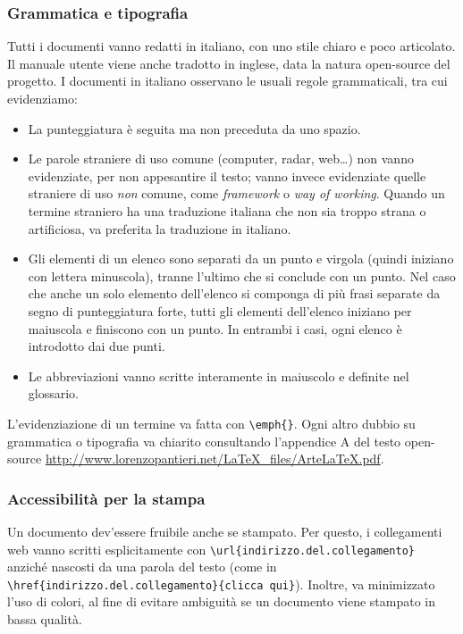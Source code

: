 \subsubsection{Grammatica e tipografia} Tutti i documenti vanno redatti in italiano, con uno stile chiaro e poco articolato. Il manuale utente viene anche tradotto in inglese, data la natura open-source del progetto. I documenti in italiano osservano le usuali regole grammaticali, tra cui evidenziamo:
\begin{itemize}
	\item La punteggiatura è seguita ma non preceduta da uno spazio.
	\item Le parole straniere di uso comune (computer, radar, web\dots) non vanno evidenziate, per non appesantire il testo; vanno invece evidenziate quelle straniere di uso \emph{non} comune, come \emph{framework} o \emph{way of working}. Quando un termine straniero ha una traduzione italiana che non sia troppo strana o artificiosa, va preferita la traduzione in italiano.
	\item Gli elementi di un elenco sono separati da un punto e virgola (quindi iniziano con lettera minuscola), tranne l'ultimo che si conclude con un punto. Nel caso che anche un solo elemento dell'elenco si componga di più frasi separate da segno di punteggiatura forte, tutti gli elementi dell'elenco iniziano per maiuscola e finiscono con un punto. In entrambi i casi, ogni elenco è introdotto dai due punti.
	\item Le abbreviazioni vanno scritte interamente in maiuscolo e definite nel glossario.
\end{itemize}
L'evidenziazione di un termine va fatta con \texttt{\textbackslash emph\{\}}. Ogni altro dubbio su grammatica o tipografia va chiarito consultando l'appendice A del testo open-source \url{http://www.lorenzopantieri.net/LaTeX_files/ArteLaTeX.pdf}.

\subsubsection{Accessibilità per la stampa} Un documento dev'essere fruibile anche se stampato. Per questo, i collegamenti web vanno scritti esplicitamente con \texttt{\textbackslash url\{indirizzo.del.collegamento\}} anziché nascosti da una parola del testo (come in \texttt{\textbackslash href\{indirizzo.del.collegamento\}\{clicca qui\}}). Inoltre, va minimizzato l'uso di colori, al fine di evitare ambiguità se un documento viene stampato in bassa qualità.



